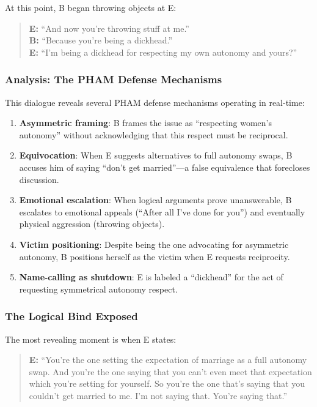\documentclass[12pt, letterpaper]{article}
\begin{document}
At this point, B began throwing objects at E:

\begin{quote}
\textbf{E:} ``And now you're throwing stuff at me.''\\
\textbf{B:} ``Because you're being a dickhead.''\\
\textbf{E:} ``I'm being a dickhead for respecting my own autonomy and yours?''
\end{quote}

\subsubsection{Analysis: The PHAM Defense Mechanisms}

This dialogue reveals several PHAM defense mechanisms operating in real-time:

\begin{enumerate}
    \item \textbf{Asymmetric framing}: B frames the issue as ``respecting women's autonomy'' without acknowledging that this respect must be reciprocal.
    
    \item \textbf{Equivocation}: When E suggests alternatives to full autonomy swaps, B accuses him of saying ``don't get married''---a false equivalence that forecloses discussion.
    
    \item \textbf{Emotional escalation}: When logical arguments prove unanswerable, B escalates to emotional appeals (``After all I've done for you'') and eventually physical aggression (throwing objects).
    
    \item \textbf{Victim positioning}: Despite being the one advocating for asymmetric autonomy, B positions herself as the victim when E requests reciprocity.
    
    \item \textbf{Name-calling as shutdown}: E is labeled a ``dickhead'' for the act of requesting symmetrical autonomy respect.
\end{enumerate}

\subsubsection{The Logical Bind Exposed}

The most revealing moment is when E states:

\begin{quote}
\textbf{E:} ``You're the one setting the expectation of marriage as a full autonomy swap. And you're the one saying that you can't even meet that expectation which you're setting for yourself. So you're the one that's saying that you couldn't get married to me. I'm not saying that. You're saying that.''
\end{quote}
\end{document}
